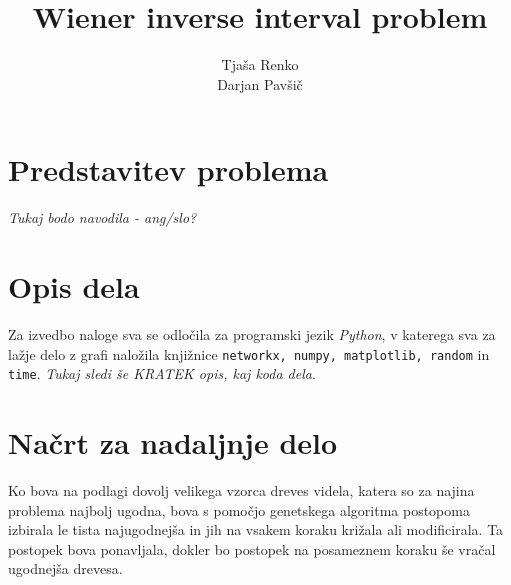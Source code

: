 \documentclass[a4paper, 12 pt]{article}
\title{Wiener inverse interval problem}
\author{Tjaša Renko \\ Darjan Pavšič}
\begin{document}
\maketitle

\section{Predstavitev problema}

\textit{Tukaj bodo navodila - ang/slo?}

\section{Opis dela}

Za izvedbo naloge sva se odločila za programski jezik \textit{Python}, v katerega sva za lažje delo z grafi naložila knjižnice \texttt{networkx, numpy, matplotlib, random} in \texttt{time}.
\textit{Tukaj sledi še KRATEK opis, kaj koda dela}.

\section{Načrt za nadaljnje delo}

Ko bova na podlagi dovolj velikega vzorca dreves videla, katera so za najina problema najbolj ugodna, bova s pomočjo genetskega algoritma postopoma izbirala le tista najugodnejša in jih na vsakem koraku križala ali modificirala. Ta postopek bova ponavljala, dokler bo postopek na posameznem koraku še vračal ugodnejša drevesa.
\end{document}
